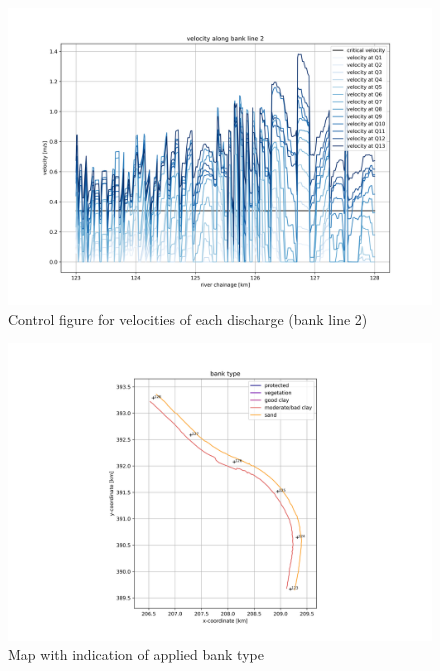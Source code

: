 \begin{figure}
\includegraphics[width=\textwidth]{figures/9_velocity_bank_2.png}
\caption{Control figure for velocities of each discharge (bank line 2)}
\label{Fig2.11}
\end{figure}

\begin{figure}
\includegraphics[width=\textwidth]{figures/10_banktype.png}
\caption{Map with indication of applied bank type}
\label{Fig2.12}
\end{figure}

